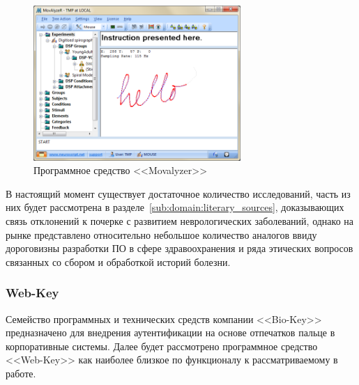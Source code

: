\begin{figure}[ht]
    \centering
    \includegraphics[width=0.7\textwidth]{figures/movalyzer.png}
    \caption{Программное средство <<Movalyzer>>}
    \label{fig:domain:analogs:movalyzer}
\end{figure}

В настоящий момент существует достаточное количество исследований, часть из них будет рассмотрена в разделе~\ref{sub:domain:literary_sources}, доказывающих связь отклонений к почерке с развитием неврологических заболеваний, однако на рынке представлено относительно небольшое количество аналогов ввиду дороговизны разработки ПО в сфере здравоохранения и ряда этических вопросов связанных со сбором и обработкой историй болезни.

\subsubsection{Web-Key}
\label{sub:domain:analogs:biokey}
Семейство программных и технических средств компании <<Bio-Key>>~\cite{analogs_biokey} предназначено для внедрения аутентификации на основе отпечатков пальце в корпоративные системы. Далее будет рассмотрено программное средство <<Web-Key>> как наиболее близкое по функционалу к рассматриваемому в работе.

